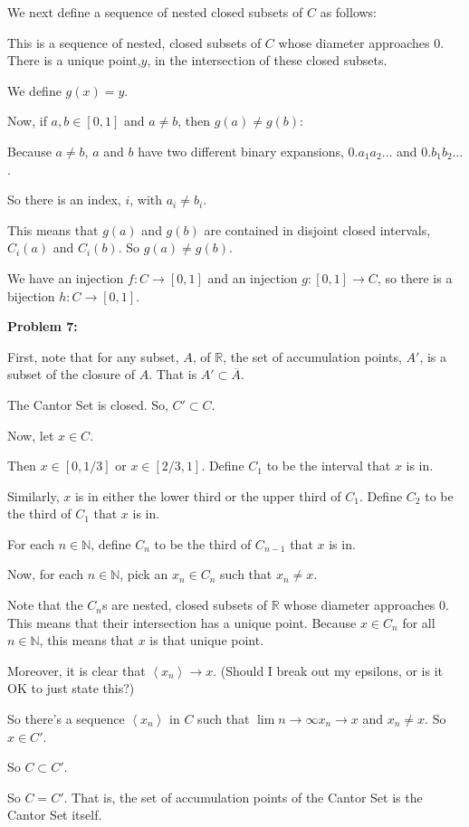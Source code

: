 \documentclass[a4paper,12pt]{article}
\newcommand{\tab}{\hspace{4mm}} %
\newcommand{\shunt}{\vspace{20mm}}
\newcommand{\anbrack}[1]{\left\langle #1 \right\rangle}
\newcommand{\N}{\mathbb{N}}
\newcommand{\R}{\mathbb{R}}
\begin{document}
\tab We next define a sequence of nested closed subsets of $C$ as follows:

\tab \tab %

\tab This is a sequence of nested, closed subsets of $C$ whose diameter approaches $0$. There is a unique point,$y$, in the intersection of these closed subsets.

\tab We define $g(x) = y$.

\tab Now, if $a, b \in [0,1]$ and $a \neq b$, then $g(a) \neq g(b)$:

\tab \tab Because $a \neq b$, $a$ and $b$ have two different binary expansions, $0.a_1a_2 \ldots $ and $0.b_1b_2 \ldots$.

\tab \tab So there is an index, $i$, with $a_i \neq b_i$.

\tab \tab This means that $g(a)$ and $g(b)$ are contained in disjoint closed intervals, $C_i(a)$ and $C_i(b)$. So $g(a) \neq g(b)$.

We have an injection $f: C \to [0,1]$ and an injection $g: [0,1] \to C$, so there is a bijection $h: C \to [0,1]$.

\shunt

{\bf Problem 7:}

First, note that for any subset, $A$, of $\R$, the set of accumulation points, $A'$, is a subset of the closure of $A$. That is $A' \subset \overline{A}$.

The Cantor Set is closed. So, $C' \subset C$.

Now, let $x \in C$.

\tab Then $x \in [0,1/3]$ or $x \in [2/3, 1]$. Define $C_1$ to be the interval that $x$ is in.

\tab Similarly, $x$ is in either the lower third or the upper third of $C_1$. Define $C_2$ to be the third of $C_1$ that $x$ is in.

\tab For each $n \in \N$, define $C_n$ to be the third of $C_{n-1}$ that $x$ is in.

\tab Now, for each $n \in \N$, pick an $x_n \in C_n$ such that $x_n \neq x$.

\tab Note that the $C_n$s are nested, closed subsets of $\R$ whose diameter approaches $0$. This means that their intersection has a unique point. Because $x \in C_n$ for all $n \in \N$, this means that $x$ is that unique point.

\tab Moreover, it is clear that $\anbrack{x_n} \to x$. (Should I break out my epsilons, or is it OK to just state this?)

\tab So there's a sequence $\anbrack{x_n}$ in $C$ such that $\lim\limits{n \to \infty} x_n \to x$ and $x_n \neq x$. So $x \in C'$.

So $C \subset C'$.

So $C = C'$. That is, the set of accumulation points of the Cantor Set is the Cantor Set itself.

\shunt
\end{document}
